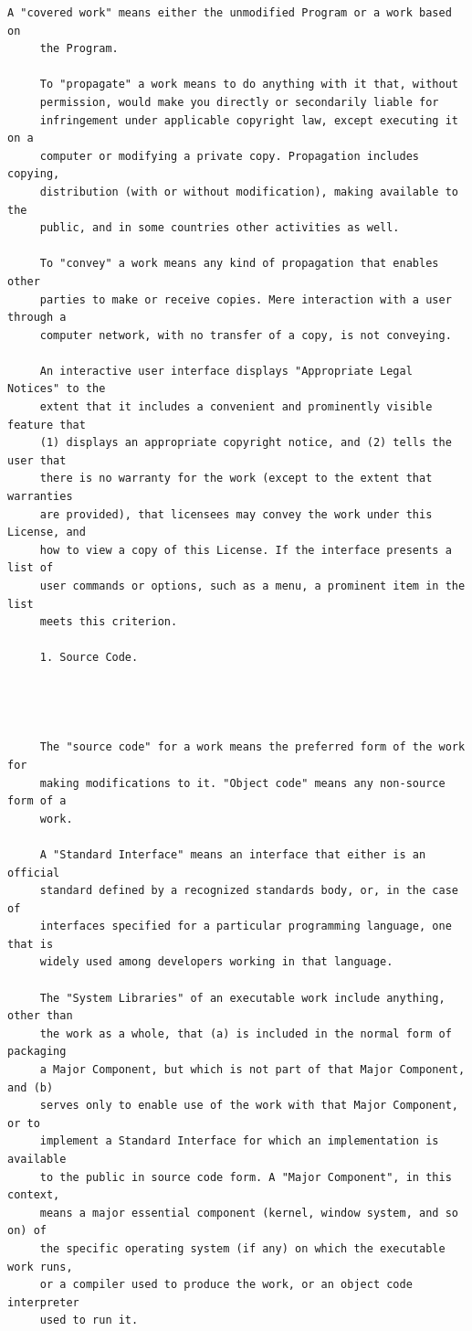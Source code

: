 \begin{lstlisting}[basicstyle=\ttfamily\footnotesize,breaklines=true]
     A "covered work" means either the unmodified Program or a work based on
     the Program.

     To "propagate" a work means to do anything with it that, without
     permission, would make you directly or secondarily liable for
     infringement under applicable copyright law, except executing it on a
     computer or modifying a private copy. Propagation includes copying,
     distribution (with or without modification), making available to the
     public, and in some countries other activities as well.

     To "convey" a work means any kind of propagation that enables other
     parties to make or receive copies. Mere interaction with a user through a
     computer network, with no transfer of a copy, is not conveying.

     An interactive user interface displays "Appropriate Legal Notices" to the
     extent that it includes a convenient and prominently visible feature that
     (1) displays an appropriate copyright notice, and (2) tells the user that
     there is no warranty for the work (except to the extent that warranties
     are provided), that licensees may convey the work under this License, and
     how to view a copy of this License. If the interface presents a list of
     user commands or options, such as a menu, a prominent item in the list
     meets this criterion.

     1. Source Code.




     The "source code" for a work means the preferred form of the work for
     making modifications to it. "Object code" means any non-source form of a
     work.

     A "Standard Interface" means an interface that either is an official
     standard defined by a recognized standards body, or, in the case of
     interfaces specified for a particular programming language, one that is
     widely used among developers working in that language.

     The "System Libraries" of an executable work include anything, other than
     the work as a whole, that (a) is included in the normal form of packaging
     a Major Component, but which is not part of that Major Component, and (b)
     serves only to enable use of the work with that Major Component, or to
     implement a Standard Interface for which an implementation is available
     to the public in source code form. A "Major Component", in this context,
     means a major essential component (kernel, window system, and so on) of
     the specific operating system (if any) on which the executable work runs,
     or a compiler used to produce the work, or an object code interpreter
     used to run it.


\end{lstlisting}
